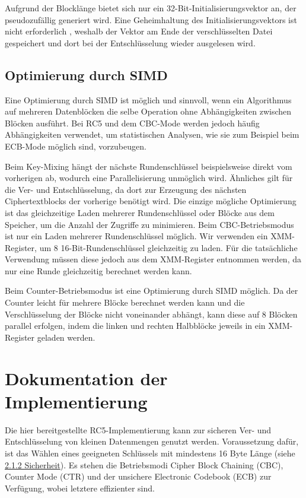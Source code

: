 \documentclass[course=erap]{aspdoc}
\begin{document}
Aufgrund der Blocklänge bietet sich nur ein 32-Bit-Initialisierungsvektor an, der pseudozufällig generiert wird.
Eine Geheimhaltung des Initialisierungsvektors ist nicht erforderlich \cite[p.194]{appcrypt}, weshalb der Vektor am Ende der verschlüsselten Datei gespeichert und dort bei der Entschlüsselung wieder ausgelesen wird.

\subsection{Optimierung durch SIMD}
Eine Optimierung durch SIMD ist möglich und sinnvoll, wenn ein Algorithmus auf mehreren Datenblöcken die selbe Operation ohne Abhängigkeiten zwischen Blöcken ausführt. Bei RC5 und dem CBC-Mode werden jedoch häufig Abhängigkeiten verwendet, um statistischen Analysen, wie sie zum Beispiel beim ECB-Mode möglich sind, vorzubeugen.\bigbreak

Beim Key-Mixing hängt der nächste Rundenschlüssel beispielsweise direkt vom vorherigen ab, wodurch eine Parallelisierung unmöglich wird.
Ähnliches gilt für die Ver- und Entschlüsselung, da dort zur Erzeugung des nächsten Ciphertextblocks der vorherige benötigt wird. Die einzige mögliche Optimierung ist das gleichzeitige Laden mehrerer Rundenschlüssel oder Blöcke aus dem Speicher, um die Anzahl der Zugriffe zu minimieren. Beim CBC-Betriebsmodus ist nur ein Laden mehrerer Rundenschlüssel möglich. Wir verwenden ein XMM-Register, um 8 16-Bit-Rundenschlüssel gleichzeitig zu laden. Für die tatsächliche Verwendung müssen diese jedoch aus dem XMM-Register entnommen werden, da nur eine Runde gleichzeitig berechnet werden kann.\bigbreak

Beim Counter-Betriebsmodus ist eine Optimierung durch SIMD möglich. Da der Counter leicht für mehrere Blöcke berechnet werden kann und die Verschlüsselung der Blöcke nicht voneinander abhängt, kann diese auf 8 Blöcken parallel erfolgen, indem die linken und rechten Halbblöcke jeweils in ein XMM-Register geladen werden.

\section{Dokumentation der Implementierung}
Die hier bereitgestellte RC5-Implementierung kann zur sicheren Ver- und Entschlüsselung von kleinen Datenmengen genutzt werden.
Voraussetzung dafür, ist das Wählen eines geeigneten Schlüssels mit mindestens 16 Byte Länge (siehe
\hyperref[sec:Sicherheit]{2.1.2 Sicherheit}).
Es stehen die Betriebsmodi Cipher Block Chaining (CBC), Counter Mode (CTR) und der unsichere Electronic Codebook (ECB) zur Verfügung, wobei letztere effizienter sind.\bigbreak
\end{document}

